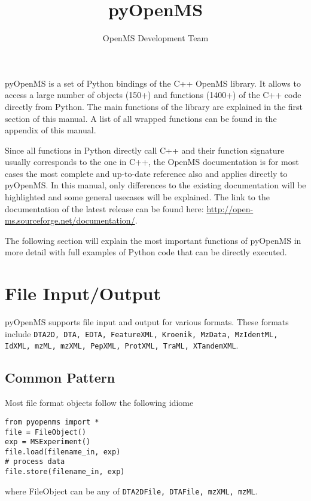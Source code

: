 \documentclass[10pt]{article}
\title{pyOpenMS }
\author{OpenMS Development Team}
\date{}
\begin{document}
  \maketitle

  pyOpenMS is a set of Python bindings of the C++ OpenMS library. It allows to
  access a large number of objects (150+) and functions (1400+) of the C++
  code directly from Python. 
  The main functions of the library are explained in the first section of this
  manual. A list of all wrapped functions can be found in the appendix of this
  manual.

  Since all functions in Python directly call C++ and their function signature
  usually corresponds to the one in C++, the OpenMS documentation is for most
  cases the most complete and up-to-date reference also and applies directly
  to pyOpenMS. In this manual, only differences to the existing documentation
  will be highlighted and some general usecases will be explained. The link to
  the documentation of the latest release can be found here:
  \url{http://open-ms.sourceforge.net/documentation/}.

  \tableofcontents

  \pagebreak

  The following section will explain the most important functions of pyOpenMS
  in more detail with full examples of Python code that can be directly
  executed.

\section{File Input/Output}

  pyOpenMS supports file input and output for various formats. These formats
  include \texttt{DTA2D, DTA, EDTA, FeatureXML, Kroenik, MzData, MzIdentML, IdXML, mzML,
  mzXML, PepXML, ProtXML, TraML, XTandemXML}.

\subsection{Common Pattern}

Most file format objects follow the following idiome

\begin{verbatim}
from pyopenms import *
file = FileObject() 
exp = MSExperiment() 
file.load(filename_in, exp)
# process data
file.store(filename_in, exp)
\end{verbatim}

where FileObject can be any of \texttt{DTA2DFile, DTAFile, mzXML, mzML}.
\end{document}
